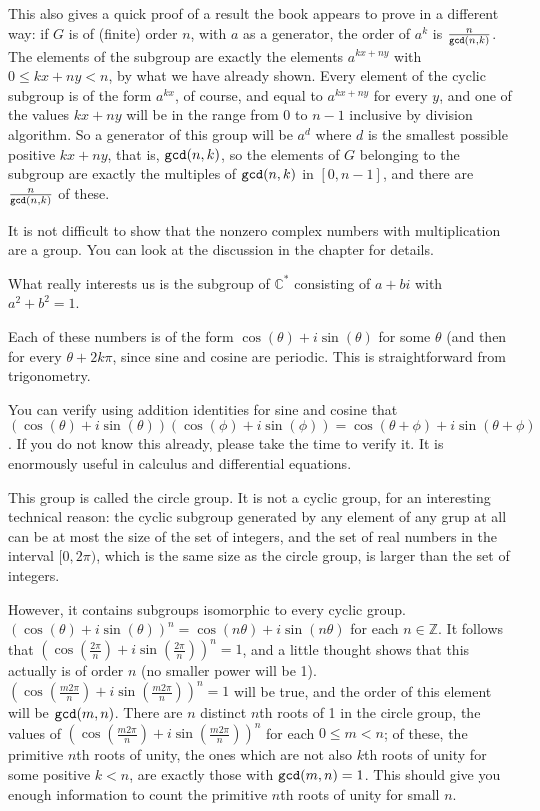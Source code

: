 \documentclass[12pt]{article}
\begin{document}
This also gives a quick proof of a result the book appears to prove in a different way:  if $G$ is of (finite) order $n$, with $a$ as a generator, the order of $a^k$ is
$\frac n{{\tt gcd}(n,k)}$.  The elements of the subgroup are exactly the elements $a^{kx + ny}$ with $0 \leq kx+ny <n$, by what we have already shown.
Every element of the cyclic subgroup is of the form $a^{kx}$, of course, and equal to $a^{kx+ny}$ for every $y$, and one of the values $kx+ny$ will be in the range from 0 to $n-1$ inclusive by division algorithm.  So a generator of this group will be $a^d$ where $d$ is the smallest possible positive
$kx+ny$, that is, ${\tt gcd}(n,k)$, so the elements of $G$ belonging to the subgroup are exactly the multiples of ${\tt gcd}(n,k)$ in $[0,n-1]$, and there are $\frac n{{\tt gcd}(n,k)}$ of these.

It is not difficult to show that the nonzero complex numbers with multiplication are a group.  You can look at the discussion in the chapter for details.

What really interests us is the subgroup of ${\mathbb C}^*$ consisting of $a+bi$ with $a^2+b^2=1$.

Each of these numbers is of the form $\cos(\theta) + i\sin(\theta)$ for some $\theta$ (and then for every $\theta+2k\pi$, since sine and cosine are periodic.
This is straightforward from trigonometry.

You can verify using addition identities for sine and cosine that $(\cos(\theta) + i\sin(\theta))(\cos(\phi) + i\sin(\phi)) = \cos(\theta+\phi) + i\sin(\theta+\phi)$.  If you do not know this already, please take the time to verify it.  It is enormously useful in calculus and differential equations.

This group is called the circle group.  It is not a cyclic group, for an interesting technical reason:  the cyclic subgroup generated by any element of any grup at all can be at most the size of the set of integers, and the set of real numbers in the interval $[0,2\pi)$, which is the same size as the circle group, is larger than the set of integers.

However, it contains subgroups isomorphic to every cyclic group.  $(\cos(\theta) + i\sin(\theta))^n = \cos(n\theta) + i\sin(n\theta)$ for each $n \in \mathbb Z$.  It follows that $(\cos(\frac{2\pi}n) + i\sin(\frac{2\pi}n))^n = 1$, and a little thought shows that this actually is of order $n$ (no smaller power will be 1).   $(\cos(\frac{m2\pi}n) + i\sin(\frac{m2\pi}n))^n = 1$ will be true, and the order of this element will be ${\tt gcd}(m,n)$.  There are $n$ distinct $n$th roots of 1 in the circle group, the values of  $(\cos(\frac{m2\pi}n) + i\sin(\frac{m2\pi}n))^n$  for each $0 \leq m < n$;  of these,
the primitive $n$th roots of unity, the ones which are not also $k$th roots of unity for some positive $k<n$, are exactly those with ${\tt gcd}(m,n)=1$.  This should give you enough information to count the primitive $n$th roots of unity for small $n$.
\end{document}
